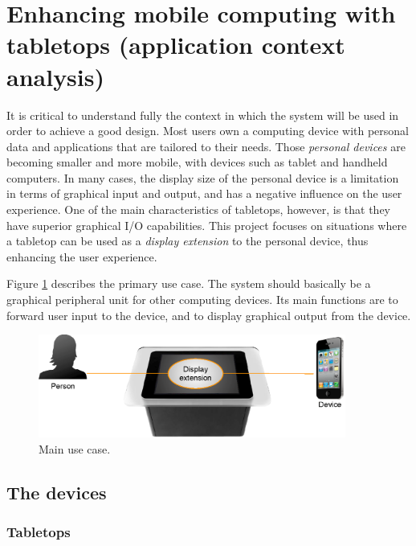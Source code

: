 \section{Enhancing mobile computing with tabletops (application context analysis)}

It is critical to understand fully the context in which the system will be used in order to achieve a good design.
Most users own a computing device with personal data and applications that are tailored to their needs.
Those \emph{personal devices} are becoming smaller and more mobile, with devices such as tablet and handheld computers.
In many cases, the display size of the personal device is a limitation in terms of graphical input and output, and has a negative influence on the user experience.
One of the main characteristics of tabletops, however, is that they have superior graphical I/O capabilities.
This project focuses on situations where a tabletop can be used as a \emph{display extension} to the personal device, thus enhancing the user experience.

Figure \ref{fig:useCase} describes the primary use case.
The system should basically be a graphical peripheral unit for other computing devices. Its main functions are to forward user input to the device, and to display graphical output from the device.

\begin{figure}[htb]
  \centering
    \includegraphics[width=0.9\textwidth]{images/useCase}
    \caption{Main use case.}
    \label{fig:useCase}
\end{figure}

\subsection{The devices}

\subsubsection{Tabletops}

